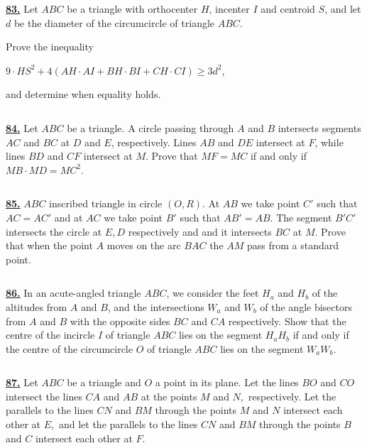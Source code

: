 \documentclass{article}
\begin{document}
$$ $$

\href{ http://www.artofproblemsolving.com/Forum/viewtopic.php?p=245463#p245463
}{\bf 83.}  Let $ABC$ be a triangle with orthocenter $H$, incenter $I$ and centroid $S$, and let $d$ be the diameter of the circumcircle of triangle $ABC$.

Prove the inequality

$9\cdot HS^2+4\left(AH\cdot AI+BH\cdot BI+CH\cdot CI\right)\geq 3d^2$,

and determine when equality holds.


$$ $$

\href{ http://www.artofproblemsolving.com/Forum/viewtopic.php?p=336205#p336205
}{\bf 84.}  Let $ABC$ be a triangle. A circle passing through $A$ and $B$ intersects segments $AC$ and $BC$ at $D$ and $E$, respectively. Lines $AB$ and $DE$ intersect at $F$, while lines $BD$ and $CF$ intersect at $M$. Prove that $MF = MC$ if and only if $MB\cdot MD = MC^2$.


$$ $$

\href{http://www.artofproblemsolving.com/Forum/viewtopic.php?p=329277#p329277
 }{\bf 85.} $ABC$ inscribed triangle in circle $(O,R)$. At $AB$ we take point $C'$ such that $AC=AC'$ and at $AC$ we take point $B'$ such that $AB'=AB$. The segment $B'C'$ intersects the circle at $E,D$ respectively and and it intersects $BC$ at $M$.
Prove that when the point $A$ moves on the arc $BAC$ the $AM$ pass from a standard point.

$$ $$


\href{http://www.artofproblemsolving.com/Forum/viewtopic.php?p=320049#p320049
 }{\bf 86.} In an acute-angled triangle $ABC$, we consider the feet $H_a$ and $H_b$ of the altitudes from $A$ and $B$, and the intersections $W_a$ and $W_b$ of the angle bisectors from $A$ and $B$ with the opposite sides $BC$ and $CA$ respectively. Show that the centre of the incircle $I$ of triangle $ABC$ lies on the segment $H_aH_b$ if and only if the centre of the circumcircle $O$ of triangle $ABC$ lies on the segment $W_aW_b$.


$$ $$

\href{ http://www.artofproblemsolving.com/Forum/viewtopic.php?p=316789#p316789
}{\bf 87.} Let $ABC$ be a triangle and $O$ a point in its plane. Let the lines $BO$ and $CO$ intersect the lines $CA$ and $AB$ at the points $M$ and $N,$ respectively. Let the parallels to the lines $CN$ and $BM$ through the points $M$ and $ N$ intersect each other at $E,$ and let the parallels to the lines $CN$ and $BM$ through the points $B$ and $C$ intersect each other at $F.$
\end{document}
